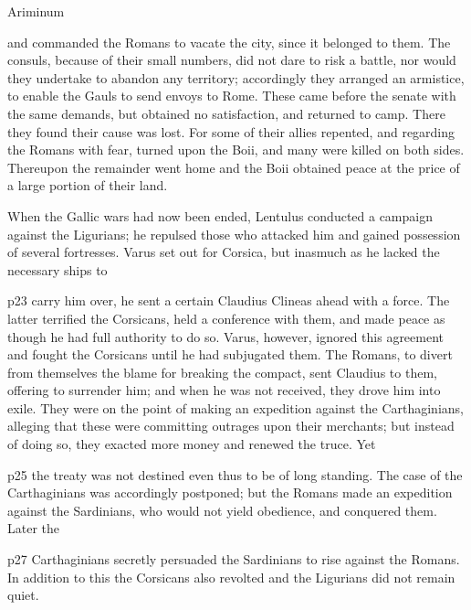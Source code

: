 Ariminum

and commanded the Romans to vacate the city, since it belonged to them. The consuls, because of their small numbers, did not dare to risk a battle, nor would they undertake to abandon any territory; accordingly they arranged an armistice, to enable the Gauls to send envoys to Rome. These came before the senate with the same demands, but obtained no satisfaction, and returned to camp. There they found their cause was lost. For some of their allies repented, and regarding the Romans with fear, turned upon the Boii, and many were killed on both sides. Thereupon the remainder went home and the Boii obtained peace at the price of a large portion of their land.

When the Gallic wars had now been ended, Lentulus conducted a campaign against the Ligurians; he repulsed those who attacked him and gained possession of several fortresses. Varus set out for Corsica, but inasmuch as he lacked the necessary ships to

p23 carry him over, he sent a certain Claudius Clineas ahead with a force. The latter terrified the Corsicans, held a conference with them, and made peace as though he had full authority to do so. Varus, however, ignored this agreement and fought the Corsicans until he had subjugated them. The Romans, to divert from themselves the blame for breaking the compact, sent Claudius to them, offering to surrender him; and when he was not received, they drove him into exile. They were on the point of making an expedition against the Carthaginians, alleging that these were committing outrages upon their merchants; but instead of doing so, they exacted more money and renewed the truce. Yet

p25 the treaty was not destined even thus to be of long standing. The case of the Carthaginians was accordingly postponed; but the Romans made an expedition against the Sardinians, who would not yield obedience, and conquered them. Later the

p27 Carthaginians secretly persuaded the Sardinians to rise against the Romans. In addition to this the Corsicans also revolted and the Ligurians did not remain quiet.


